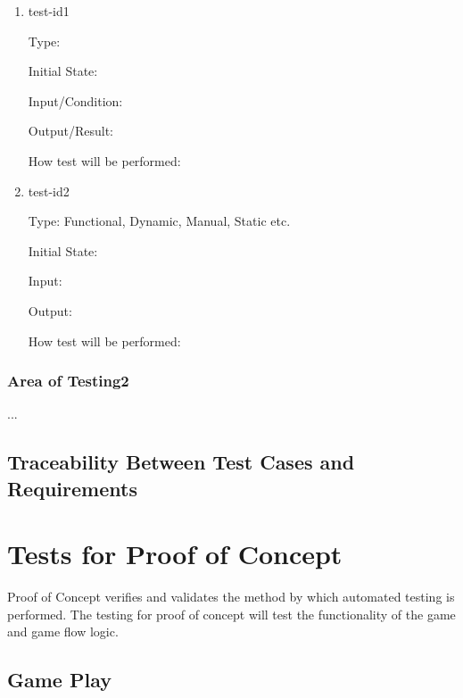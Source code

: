 \documentclass[12pt, titlepage]{article}
\begin{document}
\begin{enumerate}

\item{test-id1\\}

Type: 
					
Initial State: 
					
Input/Condition: 
					
Output/Result: 
					
How test will be performed: 
					
\item{test-id2\\}

Type: Functional, Dynamic, Manual, Static etc.
					
Initial State: 
					
Input: 
					
Output: 
					
How test will be performed: 

\end{enumerate}

\subsubsection{Area of Testing2}

...

\subsection{Traceability Between Test Cases and Requirements}

\section{Tests for Proof of Concept}

Proof of Concept verifies and validates the method by which automated testing is performed. The testing for proof of concept will test the functionality of the game and game flow logic. 

\subsection{Game Play}
\end{document}
